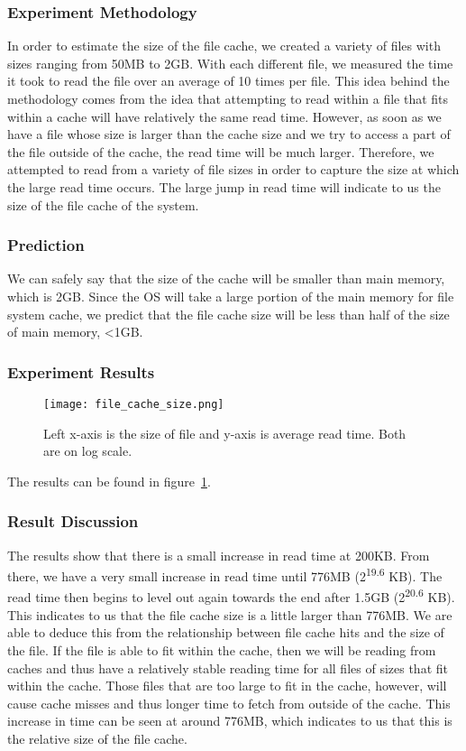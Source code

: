 \documentclass{article} %
\begin{document}
\subsubsection{Experiment Methodology}
In order to estimate the size of the file cache, we created a variety of files with sizes ranging from 50MB to 2GB. With each different file, we measured the time it took to read the file over an average of 10 times per file. This idea behind the methodology comes from the idea that attempting to read within a file that fits within a cache will have relatively the same read time. However, as soon as we have a file whose size is larger than the cache size and we try to access a part of the file outside of the cache, the read time will be much larger. Therefore, we attempted to read from a variety of file sizes in order to capture the size at which the large read time occurs. The large jump in read time will indicate to us the size of the file cache of the system. 

\subsubsection{Prediction}
We can safely say that the size of the cache will be smaller than main memory, which is 2GB. Since the OS will take a large portion of the main memory for file system cache, we predict that the file cache size will be less than half of the size of main memory, <1GB. 

\subsubsection{Experiment Results}

\begin{figure}[!htb]
  \centering
  \texttt{[image: file\_cache\_size.png]}
  \caption{Left x-axis is the size of file and y-axis is average read time. Both are on log scale.}
  \label{fig:file_cache_size}
\end{figure}

The results can be found in figure~\ref{fig:file_cache_size}.

\subsubsection{Result Discussion}
The results show that there is a small increase in read time at 200KB. From there, we have a very small increase in read time until 776MB (2\textsuperscript{19.6} KB). The read time then begins to level out again towards the end after 1.5GB (2\textsuperscript{20.6} KB). This indicates to us that the file cache size is a little larger than 776MB. We are able to deduce this from the relationship between file cache hits and the size of the file. If the file is able to fit within the cache, then we will be reading from caches and thus have a relatively stable reading time for all files of sizes that fit within the cache. Those files that are too large to fit in the cache, however, will cause cache misses and thus longer time to fetch from outside of the cache. This increase in time can be seen at around 776MB, which indicates to us that this is the relative size of the file cache. 
\end{document}
